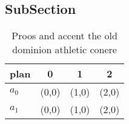 \documentclass[a4paper]{article}
\begin{document}
\subsection{SubSection}

\begin{table}
\begin{adjustbox}{width=0.6\columnwidth}
\begin{tabular}{|l|l|l|l|}
\hline
\textbf{plan} & \multicolumn{1}{c|}{\textbf{0}} & \multicolumn{1}{c|}{\textbf{1}} & \multicolumn{1}{c|}{\textbf{2}} \\ \hline
\textbf{$a_0$}  & (0,0) & (1,0) & (2,0) \\ \hline
\textbf{$a_1$}  & (0,0) & (1,0) & (2,0) \\ \hline
\end{tabular}
\end{adjustbox}
\caption{Proos and accent the old dominion athletic conere
}
\end{table}
\end{document}
